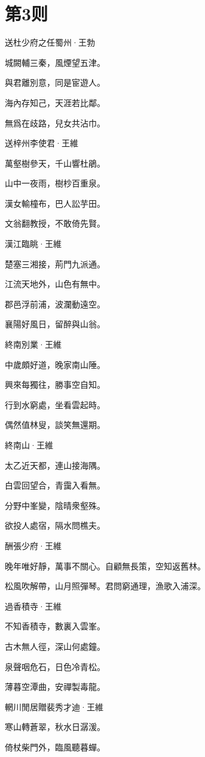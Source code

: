 \documentclass[12pt,a4paper]{ctexbook}
\begin{document}
\section{第3则}
送杜少府之任蜀州·王勃\par
城闕輔三秦，風煙望五津。\par
與君離別意，同是宦遊人。\par
海內存知己，天涯若比鄰。\par
無爲在歧路，兒女共沾巾。\par
送梓州李使君·王維\par
萬壑樹參天，千山響杜鵑。\par
山中一夜雨，樹杪百重泉。\par
漢女輸橦布，巴人訟芋田。\par
文翁翻教授，不敢倚先賢。\par
漢江臨眺·王維\par
楚塞三湘接，荊門九派通。\par
江流天地外，山色有無中。\par
郡邑浮前浦，波瀾動遠空。\par
襄陽好風日，留醉與山翁。\par
終南別業·王維\par
中歲頗好道，晚家南山陲。\par
興來每獨往，勝事空自知。\par
行到水窮處，坐看雲起時。\par
偶然值林叟，談笑無還期。\par
終南山·王維\par
太乙近天都，連山接海隅。\par
白雲回望合，青靄入看無。\par
分野中峯變，陰晴衆壑殊。\par
欲投人處宿，隔水問樵夫。\par
酬張少府·王維\par
晚年唯好靜，萬事不關心。自顧無長策，空知返舊林。\par
松風吹解帶，山月照彈琴。君問窮通理，漁歌入浦深。\par
過香積寺·王維\par
不知香積寺，數裏入雲峯。\par
古木無人徑，深山何處鐘。\par
泉聲咽危石，日色冷青松。\par
薄暮空潭曲，安禪製毒龍。\par
輞川閒居贈裴秀才迪·王維\par
寒山轉蒼翠，秋水日潺湲。\par
倚杖柴門外，臨風聽暮蟬。\par
\end{document}
